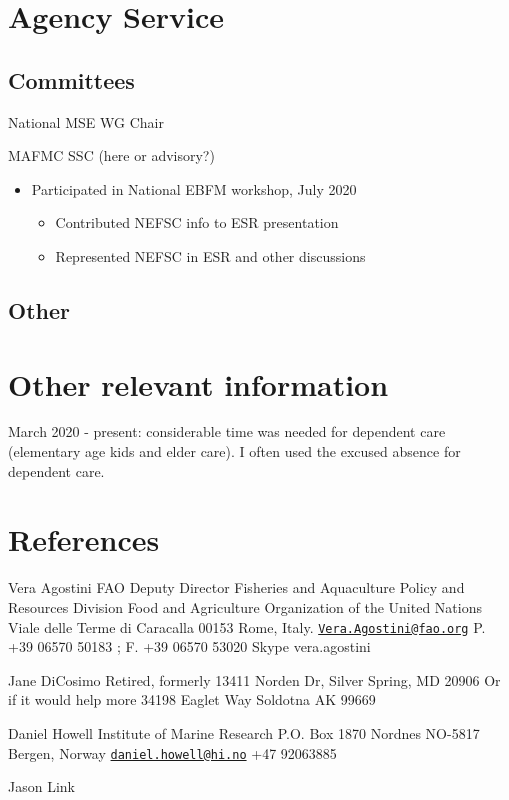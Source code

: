 \documentclass[11pt, a4paper]{awesome-cv}
\providecommand{\tightlist}{%
	\setlength{\itemsep}{0pt}\setlength{\parskip}{0pt}}
\begin{document}
\hypertarget{agency-service}{%
\section{Agency Service}\label{agency-service}}

\hypertarget{committees}{%
\subsection{Committees}\label{committees}}

National MSE WG Chair

MAFMC SSC (here or advisory?)

\begin{itemize}
\tightlist
\item
  Participated in National EBFM workshop, July 2020

  \begin{itemize}
  \tightlist
  \item
    Contributed NEFSC info to ESR presentation
  \item
    Represented NEFSC in ESR and other discussions
  \end{itemize}
\end{itemize}

\hypertarget{other}{%
\subsection{Other}\label{other}}

\hypertarget{other-relevant-information}{%
\section{Other relevant information}\label{other-relevant-information}}

March 2020 - present: considerable time was needed for dependent care
(elementary age kids and elder care). I often used the excused absence
for dependent care.

\hypertarget{references}{%
\section{References}\label{references}}

Vera Agostini FAO Deputy Director Fisheries and Aquaculture Policy and
Resources Division Food and Agriculture Organization of the United
Nations Viale delle Terme di Caracalla 00153 Rome, Italy.
\href{mailto:Vera.Agostini@fao.org}{\nolinkurl{Vera.Agostini@fao.org}}
P. +39 06570 50183 ; F. +39 06570 53020 Skype vera.agostini

Jane DiCosimo Retired, formerly 13411 Norden Dr, Silver Spring, MD 20906
Or if it would help more 34198 Eaglet Way Soldotna AK 99669

Daniel Howell Institute of Marine Research P.O. Box 1870 Nordnes NO-5817
Bergen, Norway
\href{mailto:daniel.howell@hi.no}{\nolinkurl{daniel.howell@hi.no}} +47
92063885

Jason Link
\end{document}
